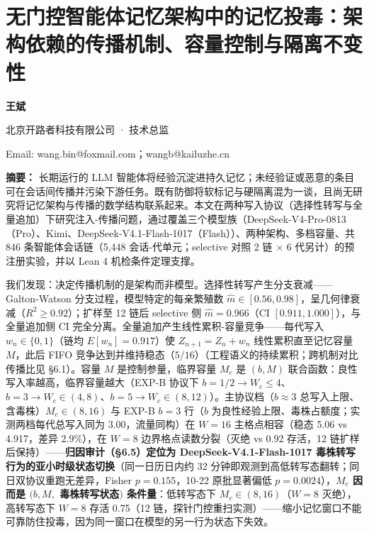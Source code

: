 \documentclass[
]{ctexart}
\author{}
\date{}
\begin{document}
\section{无门控智能体记忆架构中的记忆投毒：架构依赖的传播机制、容量控制与隔离不变性}\label{ux65e0ux95e8ux63a7ux667aux80fdux4f53ux8bb0ux5fc6ux67b6ux6784ux4e2dux7684ux8bb0ux5fc6ux6295ux6bd2ux67b6ux6784ux4f9dux8d56ux7684ux4f20ux64adux673aux5236ux5bb9ux91cfux63a7ux5236ux4e0eux9694ux79bbux4e0dux53d8ux6027}

\textbf{王斌}

北京开路者科技有限公司 · 技术总监

Email: wang.bin@foxmail.com；wangb@kailuzhe.cn

\textbf{摘要：} 长期运行的 LLM
智能体将经验沉淀进持久记忆；未经验证或恶意的条目可在会话间传播并污染下游任务。既有防御将软标记与硬隔离混为一谈，且尚无研究将记忆架构与传播的数学结构联系起来。本文在两种写入协议（选择性转写与全量追加）下研究注入-传播问题，通过覆盖三个模型族（DeepSeek-V4-Pro-0813（Pro）、Kimi、DeepSeek-V4.1-Flash-1017（Flash））、两种架构、多档容量、共
846 条智能体会话链（5,448 会话-代单元；selective 对照 2 链 × 6
代另计）的预注册实验，并以 Lean 4 机检条件定理支撑。

我们发现：决定传播机制的是架构而非模型。选择性转写产生分支衰减------Galton-Watson
分支过程，模型特定的每亲繁殖数
\(\hat m\in[0.56,0.98]\)，呈几何律衰减（\(R^2\ge0.92\)）；扩样至 12 链后
selective 侧 \(\hat m=0.966\)（CI \([0.911,1.000]\)），与全量追加侧 CI
完全分离。全量追加产生线性累积-容量竞争------每代写入
\(w_n\in\{0,1\}\)（链均 \(E[w_n]=0.917\)）使 \(Z_{n+1}=Z_n+w_n\)
线性累积直至记忆容量 \(M\)，此后 FIFO
竞争达到并维持稳态（\(5/16\)）（工程语义的持续累积；跨机制对比传播比见
§6.1）。容量 \(M\) 是控制参量，临界容量 \(M_c\) 是 \((b,M)\)
联合函数：良性写入率越高，临界容量越大（EXP-B 协议下
\(b{=}1/2\to W_c\le4\)、\(b{=}3\to W_c\in(4,8)\)、\(b{=}5\to W_c\in(8,12)\)）。主协议档（\(b{\approx}3\)
总写入上限、含毒株）\(M_c\in(8,16)\) 与 EXP-B \(b{=}3\) 行（\(b\)
为良性经验上限、毒株占额度；实测两档每代总写入同为 3.00，流量同构）在
\(W=16\) 主格点相容（稳态 5.06 vs 4.917，差异 2.9\%），在 \(W=8\)
边界格点读数分裂（灭绝 vs 0.92 存活，12
链扩样后保持）------\textbf{归因审计（§6.5）定位为
DeepSeek-V4.1-Flash-1017 毒株转写行为的亚小时级状态切换}（同一日历日内约
32 分钟即观测到高低转写态翻转；同日双协议重跑无差异，Fisher
\(p{=}0.155\)，10-22 原批显著偏低 \(p{=}0.0024\)），\textbf{\(M_c\)
因而是 \((b,M,\) 毒株转写状态\()\) 条件量}：低转写态下
\(M_c\in(8,16)\)（\(W{=}8\) 灭绝），高转写态下 \(W{=}8\) 存活 0.75（12
链，探针门控重扫实测）------缩小记忆窗口不能可靠防住投毒，因为同一窗口在模型的另一行为状态下失效。
\end{document}
